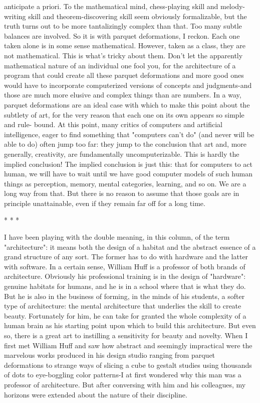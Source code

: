 anticipate a priori. To the mathematical mind, chess-playing skill and melody-writing
skill and theorem-discovering skill seem obviously formalizable, but the truth turns out to
be more tantalizingly complex than that. Too many subtle balances are involved.
        So it is with parquet deformations, I reckon. Each one taken alone is in some
sense mathematical. However, taken as a class, they are not mathematical. This is what's
tricky about them. Don't let the apparently mathematical nature of an individual one fool
you, for the architecture of a program that could create all these parquet deformations and
more good ones would have to incorporate computerized versions of concepts and
judgments-and those are much more elusive and complex things than are numbers. In a
way, parquet deformations are an ideal case with which to make this point about the
subtlety of art, for the very reason that each one on its own appears so simple and rule-
bound.
        At this point, many critics of computers and artificial intelligence, eager to find
something that "computers can't do" (and never will be able to do) often jump too far:
they jump to the conclusion that art and, more generally, creativity, are fundamentally
uncomputerizable. This is hardly the implied conclusion! The implied conclusion is just
this: that for computers to act human, we will have to wait until we have good computer
models of such human things as perception, memory, mental categories, learning, and so
on. We are a long way from that. But there is no reason to assume that those goals are in
principle unattainable, even if they remain far off for a long time.

                                         *   *   *

         I have been playing with the double meaning, in this column, of the term
"architecture": it means both the design of a habitat and the abstract essence of a grand
structure of any sort. The former has to do with hardware and the latter with software. In
a certain sense, William Huff is a professor of both brands of architecture. Obviously his
professional training is in the design of "hardware": genuine habitats for humans, and he
is in a school where that is what they do. But he is also in the business of forming, in the
minds of his students, a softer type of architecture: the mental architecture that underlies
the skill to create beauty. Fortunately for him, he can take for granted the whole
complexity of a human brain as his starting point upon which to build this architecture.
But even so, there is a great art to instilling a sensitivity for beauty and novelty.
         When I first met William Huff and saw how abstract and seemingly impractical
were the marvelous works produced in his design studio ranging from parquet
deformations to strange ways of slicing a cube to gestalt studies using thousands of dots
to eye-boggling color patterns-I at first wondered why this man was a professor of
architecture. But after conversing with him and his colleagues, my horizons were
extended about the nature of their discipline.




